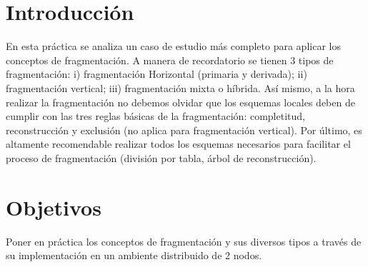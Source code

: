 \documentclass{article}
\begin{document}
\section*{Introducción}
En esta práctica se analiza un caso de estudio más completo para aplicar 
los conceptos de fragmentación. A manera de recordatorio se tienen 3 tipos de 
fragmentación: i) fragmentación Horizontal (primaria y derivada); ii) 
fragmentación vertical; iii) fragmentación mixta o híbrida. Así mismo, a la
hora realizar la fragmentación no debemos olvidar que los esquemas locales
deben de cumplir con las tres reglas básicas de la fragmentación: completitud,
reconstrucción y exclusión (no aplica para fragmentación vertical). Por último,
es altamente recomendable realizar todos los esquemas necesarios para facilitar
el proceso de fragmentación (división por tabla, árbol de reconstrucción).
\section*{Objetivos}
Poner en práctica los conceptos de fragmentación y sus diversos tipos a través 
de su implementación en un ambiente distribuido de 2 nodos.
\end{document}
